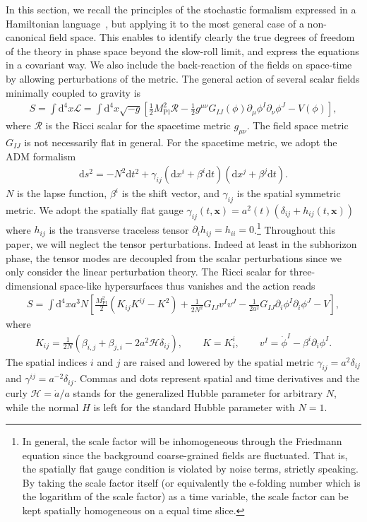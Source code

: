 \documentclass[a4paper,11pt]{article}
\newcommand{\dd}{\mathrm{d}}
\newcommand{\Mpl}{M_\text{Pl}}
\newcommand{\calH}{\mathcal{H}}
\newcommand{\scrL}{\mathscr{L}}
\newcommand{\calR}{\mathcal{R}}
\newcommand{\bae}[1]{\begin{align} #1 \end{align}}
\begin{document}
In this section, we recall the principles of the stochastic formalism expressed in a Hamiltonian language~\cite{Tolley:2008na,Grain:2017dqa,Ezquiaga:2018gbw}, 
but applying it to the most general case of a non-canonical field space. 
This enables to identify clearly the true degrees of freedom of the theory in phase space beyond the slow-roll limit, 
and express the equations in a covariant way. 
We also include the back-reaction of the fields on space-time by allowing perturbations of the metric. 
The general action of several scalar fields minimally coupled to gravity is
\bae{\label{eq: original action}
	S=\int\dd^4x\scrL=\int\dd^4x\sqrt{-g}\left[\frac{1}{2}\Mpl^2\calR-\frac{1}{2}g^{\mu\nu}G_{IJ}(\phi)\partial_\mu\phi^I\partial_\nu\phi^J-V(\phi)\right],
}
where $\calR$ is the Ricci scalar for the spacetime metric $g_{\mu\nu}$. The field space metric $G_{IJ}$ is not necessarily flat in general.
For the spacetime metric, we adopt the ADM formalism
\bae{\label{eq: ADM}
	\dd s^2=-N^2\dd t^2+\gamma_{ij}(\dd x^i+\beta^i\dd t)(\dd x^j+\beta^j\dd t).
}
$N$ is the lapse function, $\beta^i$ is the shift vector, and $\gamma_{ij}$ is the spatial symmetric metric.
We adopt the spatially flat gauge $\gamma_{ij}(t,\mathbf{x})=a^2(t)(\delta_{ij}+h_{ij}(t,\mathbf{x}))$ 
where $h_{ij}$ is the transverse traceless tensor $\partial_ih_{ij}=h_{ii}=0$.\footnote{In general, the scale factor will be inhomogeneous 
through the Friedmann equation
since the background coarse-grained fields are fluctuated. That is, the spatially flat gauge condition is violated by noise terms, strictly speaking.
By taking the scale factor itself (or equivalently the e-folding number which is the logarithm of the scale factor)
as a time variable, the scale factor can be kept spatially homogeneous on a equal time slice.} 
Throughout this paper, we will neglect the tensor perturbations. Indeed at least in the subhorizon 
phase, the tensor modes are decoupled from the scalar perturbations since we only consider the linear perturbation theory. 
The Ricci scalar for three-dimensional space-like hypersurfaces thus vanishes and the action reads~\cite{Salopek:1990jq}
\bae{
	S=\int\dd^4xa^3N\left[\frac{\Mpl^2}{2}\left(K_{ij}K^{ij}-K^2\right)+\frac{1}{2N^2}G_{IJ}v^Iv^J-\frac{1}{2a^2}G_{IJ}\partial_i\phi^I\partial_i\phi^J-V\right],
}
where
\bae{
	K_{ij}=\frac{1}{2N}(\beta_{i,j}+\beta_{j,i}-2a^2\calH\delta_{ij}), \quad\quad K=K^i_i, \quad\quad v^I=\dot{\phi}^I-\beta^i\partial_i\phi^I.
}
The spatial indices $i$ and $j$ are raised and lowered by the spatial metric $\gamma_{ij}=a^2\delta_{ij}$ and $\gamma^{ij}=a^{-2}\delta_{ij}$.
Commas and dots represent spatial and time derivatives and the curly $\calH=\dot{a}/a$ stands for the generalized Hubble parameter
for arbitrary $N$, while the normal $H$ is left for the standard Hubble parameter with $N=1$.
\end{document}
